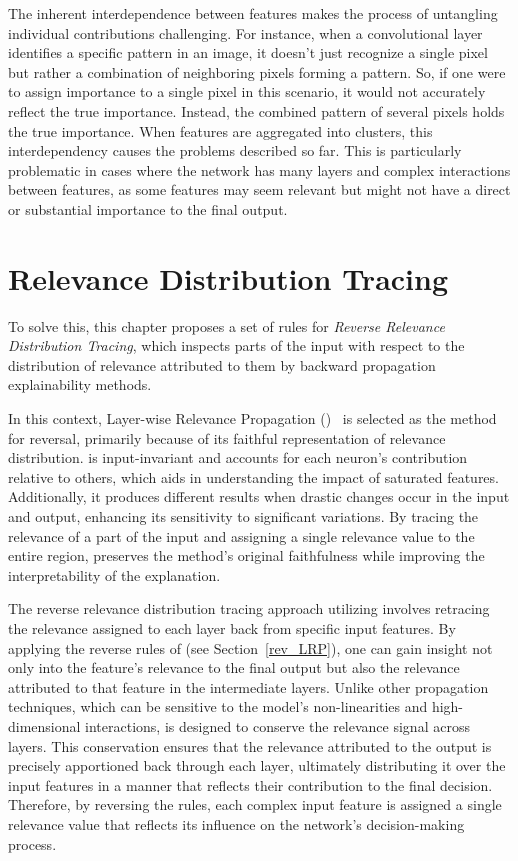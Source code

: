 The inherent interdependence between features makes the process of untangling individual contributions challenging. For instance, when a convolutional layer identifies a specific pattern in an image, it doesn't just recognize a single pixel but rather a combination of neighboring pixels forming a pattern. So, if one were to assign importance to a single pixel in this scenario, it would not accurately reflect the true importance. Instead, the combined pattern of several pixels holds the true importance. When features are aggregated into clusters, this interdependency causes the problems described so far. This is particularly problematic in cases where the network has many layers and complex interactions between features, as some features may seem relevant but might not have a direct or substantial importance to the final output.


\section{Relevance Distribution Tracing}

To solve this, this chapter proposes a set of rules for \emph{Reverse Relevance Distribution Tracing}, which inspects parts of the input with respect to the distribution of relevance attributed to them by backward propagation explainability methods.

In this context, Layer-wise Relevance Propagation (\LRP)~\cite{bach2015pixel} is selected as the method for reversal, primarily because of its faithful representation of relevance distribution. \LRP is input-invariant and accounts for each neuron's contribution relative to others, which aids in understanding the impact of saturated features. Additionally, it produces different results when drastic changes occur in the input and output, enhancing its sensitivity to significant variations. By tracing the relevance of a part of the input and assigning a single relevance value to the entire region, \LRP preserves the method's original faithfulness while improving the interpretability of the explanation.

The reverse relevance distribution tracing approach utilizing \LRP\/ involves retracing the relevance assigned to each layer back from specific input features. By applying the reverse rules of \LRP\/ (see Section~\ref{rev_LRP}), one can gain insight not only into the feature's relevance to the final output but also the relevance attributed to that feature in the intermediate layers. Unlike other propagation techniques, which can be sensitive to the model's non-linearities and high-dimensional interactions, \LRP\/ is designed to conserve the relevance signal across layers. This conservation ensures that the relevance attributed to the output is precisely apportioned back through each layer, ultimately distributing it over the input features in a manner that reflects their contribution to the final decision. Therefore, by reversing the \LRP\/ rules, each complex input feature is assigned a single relevance value that reflects its influence on the network's decision-making process.

